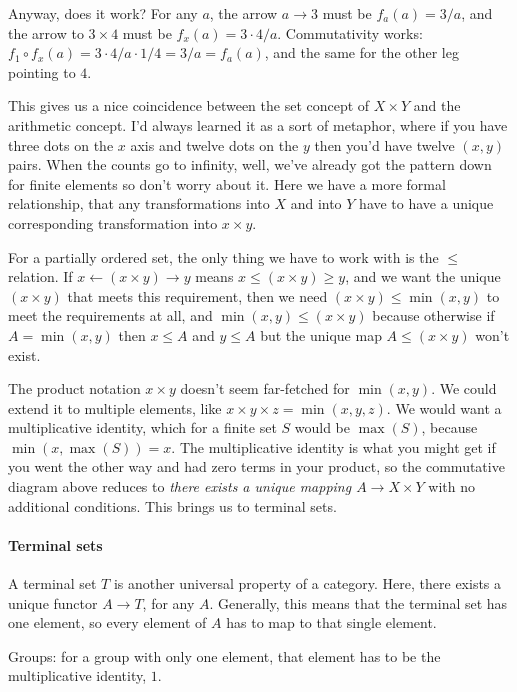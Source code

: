 \documentclass[11pt]{article}
\begin{document}
Anyway, does it work? For any $a$, the arrow $a\to 3$ must be $f_a(a)=3/a$, and the arrow to
$3\times 4$ must be $f_{x}(a)=3\cdot 4/a$. Commutativity works: $f_1\circ f_x(a) = 3\cdot
4/a\cdot 1/4 = 3/a = f_a(a)$, and the same for the other leg pointing to $4$.

This gives us a nice coincidence between the set concept of $X\times Y$ and the arithmetic
concept. I'd always learned it as a sort of metaphor, where if you have three dots on the
$x$ axis and twelve dots on the $y$ then you'd have twelve $(x,y)$ pairs. When the counts
go to infinity, well, we've already got the pattern down for finite elements so don't
worry about it. Here we have a more formal relationship, that any transformations into $X$
and into $Y$ have to have a unique corresponding transformation into $x\times y$.



For a partially ordered set, the only thing we have to work with is the $\leq$ relation.
If $x\leftarrow (x\times y) \rightarrow y$ means $x\leq (x\times y) \geq y$, and we want
the unique $(x\times y)$ that meets this requirement, then we need
$(x\times y)\leq \min(x,y)$ to meet the requirements at all, and 
$\min(x,y)\leq (x\times y)$ because otherwise if $A = \min(x,y)$ then $x\leq A$ and $y\leq
A$ but the unique map $A\leq (x\times y)$ won't exist.

The product notation $x\times y$ doesn't seem far-fetched for $\min(x,y)$. We could extend
it to multiple elements, like $x\times y\times z = \min(x,y,z)$. We would want a
multiplicative identity, which for a finite set $S$ would be $\max(S)$, because
$\min(x,\max(S)) = x$. The multiplicative identity is what you might get if you
went the other way and had zero terms in your product, so the commutative diagram above
reduces to {\em there exists a unique mapping $A\to X\times Y$} with no additional
conditions. This brings us to terminal sets.

\paragraph{Terminal sets} A terminal set $T$ is another universal property of a
category. Here, there exists a unique functor $A\to T$, for any $A$. Generally, this
means that the terminal set has one element, so every element of $A$ has to map to
that single element.

Groups: for a group with only one element, that element has to be the multiplicative identity, $1$.
\end{document}
